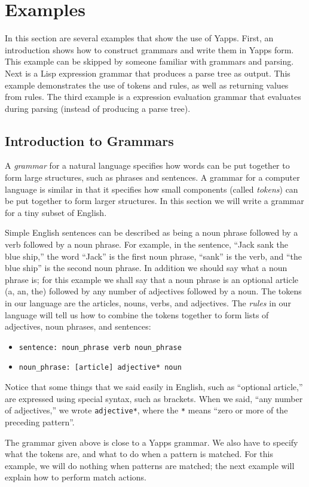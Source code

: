 \documentclass[10pt]{article}
\newcommand{\mysection}[1]{\section{#1}}
\newcommand{\mysubsection}[1]{\subsection{#1}}
\begin{document}
\mysection{Examples}

In this section are several examples that show the use of Yapps.
First, an introduction shows how to construct grammars and write them
in Yapps form.  This example can be skipped by someone familiar with
grammars and parsing.  Next is a Lisp expression grammar that produces
a parse tree as output.  This example demonstrates the use of tokens
and rules, as well as returning values from rules.  The third example
is a expression evaluation grammar that evaluates during parsing
(instead of producing a parse tree).

\mysubsection{Introduction to Grammars}

A \emph{grammar} for a natural language specifies how words can be put
together to form large structures, such as phrases and sentences.  A
grammar for a computer language is similar in that it specifies how
small components (called \emph{tokens}) can be put together to form
larger structures.  In this section we will write a grammar for a tiny
subset of English.

Simple English sentences can be described as being a noun phrase
followed by a verb followed by a noun phrase.  For example, in the
sentence, ``Jack sank the blue ship,'' the word ``Jack'' is the first
noun phrase, ``sank'' is the verb, and ``the blue ship'' is the second
noun phrase.  In addition we should say what a noun phrase is; for
this example we shall say that a noun phrase is an optional article
(a, an, the) followed by any number of adjectives followed by a noun.
The tokens in our language are the articles, nouns, verbs, and
adjectives.  The \emph{rules} in our language will tell us how to
combine the tokens together to form lists of adjectives, noun phrases,
and sentences:

\begin{itemize}
  \item \texttt{sentence: noun\_phrase verb noun\_phrase}
  \item \texttt{noun\_phrase: [article] adjective* noun}
\end{itemize}

Notice that some things that we said easily in English, such as
``optional article,'' are expressed using special syntax, such as
brackets.  When we said, ``any number of adjectives,'' we wrote
\texttt{adjective*}, where the \texttt{*} means ``zero or more of the
preceding pattern''.

The grammar given above is close to a Yapps grammar.  We also have to
specify what the tokens are, and what to do when a pattern is matched.
For this example, we will do nothing when patterns are matched; the
next example will explain how to perform match actions.
\end{document}
